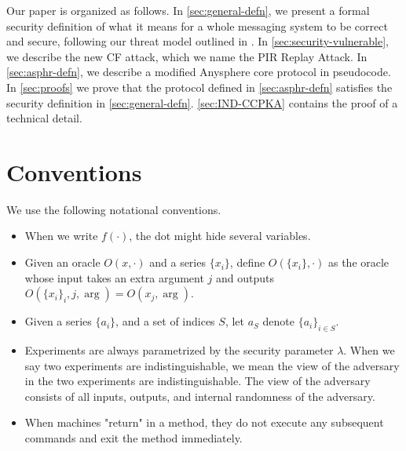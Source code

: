 Our paper is organized as follows. In \cref{sec:general-defn}, we present a formal security definition of what it means for a whole messaging system to be correct and secure, following our threat model outlined in \cite{whitepaper}. In \cref{sec:security-vulnerable}, we describe the new CF attack, which we name the PIR Replay Attack. In \cref{sec:asphr-defn}, we describe a modified Anysphere core protocol in pseudocode. In \cref{sec:proofs} we prove that the protocol defined in \cref{sec:asphr-defn} satisfies the security definition in \cref{sec:general-defn}. \cref{sec:IND-CCPKA} contains the proof of a technical detail.



\section{Conventions}
We use the following notational conventions.
\begin{itemize}
    \item When we write $f(\cdot)$, the dot might hide several variables.
    
    \item Given an oracle $O(x, \cdot)$ and a series $\{x_i\}$, define $O(\{x_i\}, \cdot)$ as the oracle whose input takes an extra argument $j$ and outputs $O(\{x_i\}_i, j, \arg) = O(x_j, \arg)$.

    \item Given a series $\{a_i\}$, and a set of indices $S$, let $a_S$ denote $\{a_i\}_{i \in S}$. 

    \item Experiments are always parametrized by the security parameter $\lambda$. When we say two experiments are indistinguishable, we mean the view of the adversary in the two experiments are indistinguishable. The view of the adversary consists of all inputs, outputs, and internal randomness of the adversary.
    
    \item When machines "return" in a method, they do not execute any subsequent commands and exit the method immediately.
\end{itemize}
